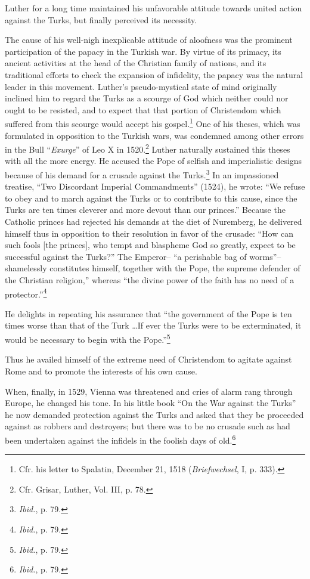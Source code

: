 Luther for a long time maintained his unfavorable attitude
towards united action against the Turks, but finally perceived its
necessity.

The cause of his well-nigh inexplicable attitude of aloofness was
the prominent participation of the papacy in the Turkish war. By
virtue of its primacy, its ancient activities at the head of the Christian
family of nations, and its traditional efforts to check the expansion
of infidelity, the papacy was the natural leader in this movement.
Luther’s pseudo-mystical state of mind originally inclined him to regard
the Turks as a scourge of God which neither could nor ought to
be resisted, and to expect that that portion of Christendom which
suffered from this scourge would accept his gospel.\footnote{Cfr. his letter to Spalatin, December 21, 1518 (\textit{Briefwechsel}, I, p. 333).}
One of his
theses, which was formulated in opposition to the Turkish wars, was
condemned among other errors in the Bull “\textit{Exurge}” of Leo X in
1520.\footnote{Cfr. Grisar, Luther, Vol. III, p. 78.}
Luther naturally sustained this theses with all the more energy.
He accused the Pope of selfish and imperialistic designs because of
his demand for a crusade against the Turks.\footnote{\textit{Ibid.}, p. 79.}
In an impassioned
treatise, “Two Discordant Imperial Commandments” (1524), he
wrote: “We refuse to obey and to march against the Turks or to
contribute to this cause, since the Turks are ten times cleverer and
more devout than our princes.” Because the Catholic princes had rejected
his demands at the diet of Nuremberg, he delivered himself
thus in opposition to their resolution in favor of the crusade: “How
can such fools [the princes], who tempt and blaspheme God so
greatly, expect to be successful against the Turks?” The Emperor--
“a perishable bag of worms”--shamelessly constitutes himself, together
with the Pope, the supreme defender of the Christian religion,”
whereas “the divine power of the faith has no need of a protector.”\footnote{\textit{Ibid.}, p. 79.}

He delights in repeating his assurance that “the government of the
Pope is ten times worse than that of the Turk \dots If ever the Turks
were to be exterminated, it would be necessary to begin with the
Pope.”\footnote{\textit{Ibid.}, p. 79.}

Thus he availed himself of the extreme need of Christendom to
agitate against Rome and to promote the interests of his own cause.

When, finally, in 1529, Vienna was threatened and cries of alarm
rang through Europe, he changed his tone. In his little book “On the
War against the Turks” he now demanded protection against the
Turks and asked that they be proceeded against as robbers and destroyers;
but there was to be no crusade such as had been undertaken
against the infidels in the foolish days of old.\footnote{\textit{Ibid.}, p. 79.}

